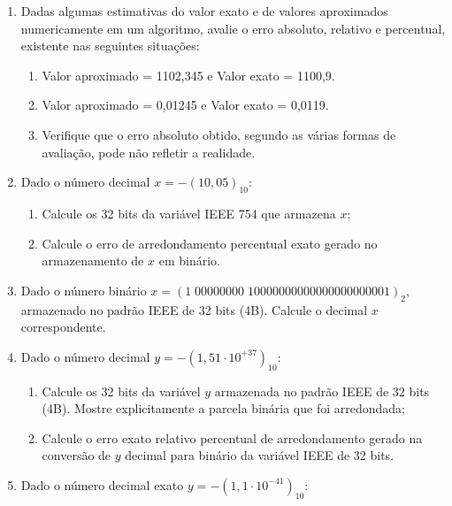 \documentclass[12pt]{article}
\newenvironment{smallitem}{
    \vspace{-2mm}
    \begin{enumerate}
    \setlength{\parskip}{0pt}
    \setlength{\itemsep}{2pt}
}{
    \vspace{-2mm}
    \end{enumerate}
}
\begin{document}
\begin{enumerate}[label=\textbf{\arabic*})]
\begin{smallitem}
\end{smallitem}

\item Dadas algumas estimativas do valor exato e de valores aproximados
numericamente em um algoritmo, avalie o erro absoluto, relativo e
percentual, existente nas seguintes situações:

\begin {smallitem}

\item Valor aproximado = 1102,345 e Valor exato = 1100,9.
\item Valor aproximado = 0,01245 e Valor exato = 0,0119.
\item Verifique que o erro absoluto obtido, segundo as várias formas de
avaliação, pode não refletir a realidade.

\end{smallitem}

\item Dado o número decimal $x = -(10,05)_{10}$:

\begin{smallitem}

\item Calcule os 32 bits da variável IEEE 754 que armazena $x$;
\item Calcule o erro de arredondamento percentual exato gerado no
armazenamento de $x$ em binário.

\end{smallitem}

\item Dado o número binário $x = (1\;00000000\;10000000000000000000001)_2$,
armazenado no padrão IEEE de 32 bits (4B). Calcule o decimal $x$
correspondente.

\item Dado o número decimal $y = -(1,51 \cdot 10^{+37})_{10}$:

\begin{smallitem}

\item Calcule os 32 bits da variável $y$ armazenada no padrão IEEE de
32 bits (4B). Mostre explicitamente a parcela binária que foi
arredondada;
\item Calcule o erro exato relativo percentual de arredondamento gerado
na conversão de $y$ decimal para binário da variável IEEE de 32 bits.

\end{smallitem}

\item Dado o número decimal exato $y = -(1,1 \cdot 10^{-41})_{10}$:


\end{enumerate}
\end{document}
